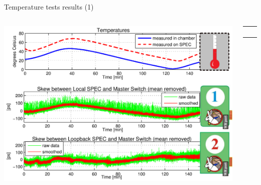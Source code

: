 \documentclass[compress,red]{beamer}
\begin{document}
% 
% 
% 
\begin{frame}{Temperature tests results (1)}


  \begin{columns}[c]
		\hspace{-1.0cm}
		\begin{center}
		\includegraphics[width=1.1\textwidth]{measurements/tempTests-trends_v3.pdf}
		\end{center}

		\begin{center}
		  \begin{table}[!t] \footnotesize 
		  \begin{tabular}{ c  c }     
		  \multicolumn{2}{c}{ }       \\         
		   \multicolumn{2}{c}{ }       \\    
		     &    \\ 
		    &     \\ 
		  \end{tabular}
		  \end{table}   		
		\end{center}


\end{columns}
\end{frame}
\end{document}
